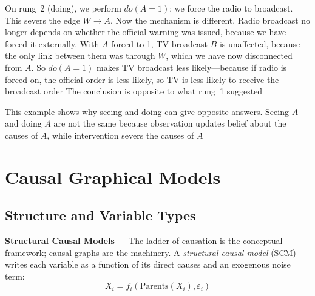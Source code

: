 On rung~2 (doing), we perform $do(A = 1)$: we force the radio to broadcast. This
severs the edge $W \to A$. Now the mechanism is different. Radio broadcast no longer
depends on whether the official warning was issued, because we have forced it
externally. With $A$ forced to 1, TV broadcast $B$ is unaffected, because the only
link between them was through $W$, which we have now disconnected from $A$. So $d
o(A=1)$ makes TV broadcast less likely—because if radio is forced on, the
official order is less likely, so TV is less likely to receive the broadcast order
The conclusion is opposite to what rung~1 suggested

This example shows why seeing and doing can give opposite answers. Seeing $A$ and
doing $A$ are not the same because observation updates belief about the causes of
$A$, while intervention severs the causes of $A$


\section{Causal Graphical Models}
\label{sec:causal-graphical-models}

\subsection{Structure and Variable Types}
\label{subsec:structure-and-variable-types}

\textbf{Structural Causal Models} --- The ladder of causation is the conceptual framework;
causal graphs are the machinery. A \emph{structural causal model} (SCM) writes
each variable as a function of its direct causes and an exogenous noise term:
\begin{equation}
  X_{i}= f_{i}(\text{Parents}(X_{i}), \varepsilon_{i}) \label{eq:scm-definition}
\end{equation}

